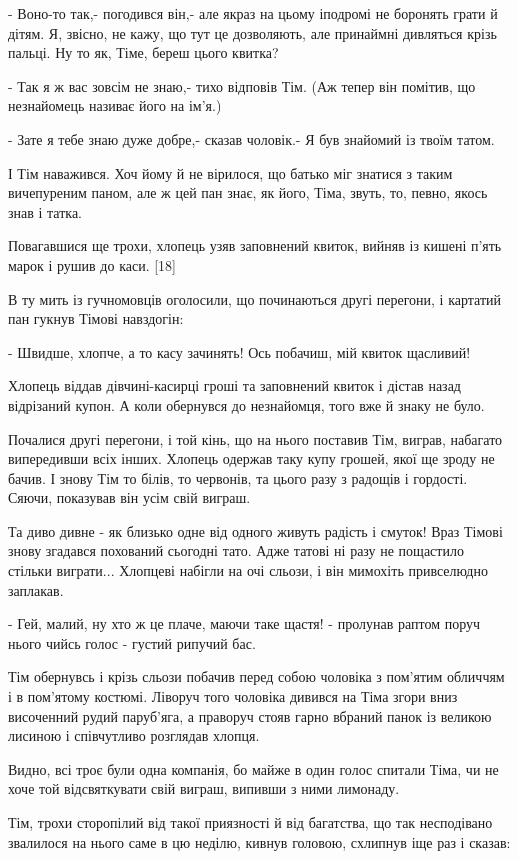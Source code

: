 - Воно-то так,- погодився він,- але якраз на цьому іподромі не боронять грати й дітям. Я, звісно, не кажу, що тут це дозволяють, але принаймні дивляться крізь пальці. Ну то як, Тіме, береш цього квитка?

- Так я ж вас зовсім не знаю,- тихо відповів Тім. (Аж тепер він помітив, що незнайомець називає його на ім'я.)

- Зате я тебе знаю дуже добре,- сказав чоловік.- Я був знайомий із твоїм татом.

І Тім наважився. Хоч йому й не вірилося, що батько міг знатися з таким вичепуреним паном, але ж цей пан знає, як його, Тіма, звуть, то, певно, якось знав і татка.

Повагавшися ще трохи, хлопець узяв заповнений квиток, вийняв із кишені п'ять марок і рушив до каси. [18]

В ту мить із гучномовців оголосили, що починаються другі перегони, і картатий пан гукнув Тімові навздогін:

- Швидше, хлопче, а то касу зачинять! Ось побачиш, мій квиток щасливий!

Хлопець віддав дівчині-касирці гроші та заповнений квиток і дістав назад відрізаний купон. А коли обернувся до незнайомця, того вже й знаку не було.

Почалися другі перегони, і той кінь, що на нього поставив Тім, виграв, набагато випередивши всіх інших. Хлопець одержав таку купу грошей, якої ще зроду не бачив. І знову Тім то білів, то червонів, та цього разу з радощів і гордості. Сяючи, показував він усім свій виграш.

Та диво дивне - як близько одне від одного живуть радість і смуток! Враз Тімові знову згадався похований сьогодні тато. Адже татові ні разу не пощастило стільки виграти... Хлопцеві набігли на очі сльози, і він мимохіть привселюдно заплакав.

- Гей, малий, ну хто ж це плаче, маючи таке щастя! - пролунав раптом поруч нього чийсь голос - густий рипучий бас.

Тім обернувсь і крізь сльози побачив перед собою чоловіка з пом'ятим обличчям і в пом'ятому костюмі. Ліворуч того чоловіка дивився на Тіма згори вниз височенний рудий паруб'яга, а праворуч стояв гарно вбраний панок із великою лисиною і співчутливо розглядав хлопця.

Видно, всі троє були одна компанія, бо майже в один голос спитали Тіма, чи не хоче той відсвяткувати свій виграш, випивши з ними лимонаду.

Тім, трохи сторопілий від такої приязності й від багатства, що так несподівано звалилося на нього саме в цю неділю, кивнув головою, схлипнув іще раз і сказав:

